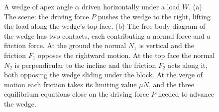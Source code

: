 \begin{figure}[htbp]
\caption[A friction wedge at limiting equilibrium]{A wedge of apex angle
$\alpha$ driven horizontally under a load $W$. (a) The scene: the driving
force $P$ pushes the wedge to the right, lifting the load along the
wedge's top face. (b) The free-body diagram of the wedge has two
contacts, each contributing a normal force and a friction force. At the
ground the normal $N_1$ is vertical and the friction $F_1$ opposes the
rightward motion. At the top face the normal $N_2$ is perpendicular to the
incline and the friction $F_2$ acts along it, both opposing the wedge
sliding under the block. At the verge of motion each friction takes its
limiting value $\mu N$, and the three equilibrium equations close on the
driving force $P$ needed to advance the wedge.}
\label{fig:vol03ch01:wedge}
\end{figure}
